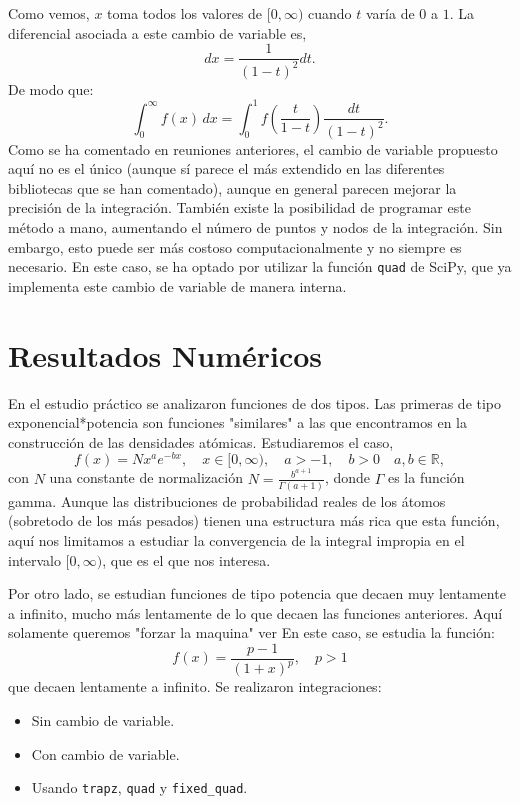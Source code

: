 \documentclass{article}
\begin{document}
Como vemos, $x$ toma todos los valores de $[0, \infty)$ cuando $t$ varía de $0$ a $1$. La diferencial asociada a este cambio de variable es, 
\[
    dx = \frac{1}{(1-t)^2} dt.
\]
De modo que:
\[
    \int_0^{\infty} f(x) \, dx = \int_0^1 f\left(\frac{t}{1-t}\right) \frac{dt}{(1-t)^2}.
\]
Como se ha comentado en reuniones anteriores, el cambio de variable propuesto aquí no es el único (aunque sí parece el más extendido en las diferentes bibliotecas que se han comentado), aunque en general parecen mejorar la precisión de la integración. También existe la posibilidad de programar este método a mano, aumentando el número de puntos y nodos de la integración. Sin embargo, esto puede ser más costoso computacionalmente y no siempre es necesario. En este caso, se ha optado por utilizar la función \texttt{quad} de SciPy, que ya implementa este cambio de variable de manera interna.

\section{Resultados Numéricos}
En el estudio práctico se analizaron funciones de dos tipos. Las primeras de tipo exponencial*potencia son funciones "similares" a las que encontramos en la construcción de las densidades atómicas. Estudiaremos el caso, 
\begin{equation}
    f(x) = N x^a e^{-bx}, \quad x \in [0, \infty), \quad a > -1, \quad b > 0 \quad a, b \in \mathbb{R},
\end{equation}
con $N$ una constante de normalización $N = \frac{b^{a+1}}{\Gamma(a+1)}$, donde $\Gamma$ es la función gamma. Aunque las distribuciones de probabilidad reales de los átomos (sobretodo de los más pesados) tienen una estructura más rica que esta función, aquí nos limitamos a estudiar la convergencia de la integral impropia en el intervalo $[0, \infty)$, que es el que nos interesa.

Por otro lado, se estudian funciones de tipo potencia que decaen muy lentamente a infinito, mucho más lentamente de lo que decaen las funciones anteriores. Aquí solamente queremos "forzar la maquina" ver  En este caso, se estudia la función:
\[
    f(x) = \frac{p-1}{(1+x)^p}, \quad p > 1
\]
que decaen lentamente a infinito. Se realizaron integraciones:
\begin{itemize}
    \item Sin cambio de variable.
    \item Con cambio de variable.
    \item Usando \texttt{trapz}, \texttt{quad} y \texttt{fixed\_quad}.
\end{itemize}
\end{document}
